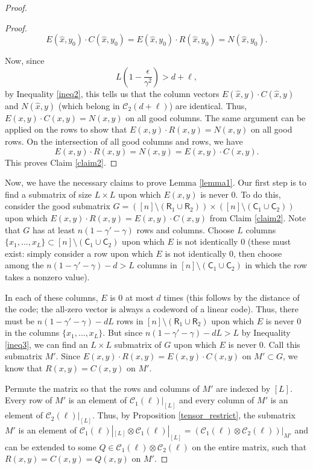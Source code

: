 \documentclass[10pt,a4paper]{amsart}
\newcommand{\Col}{\mathsf{C}}
\newcommand{\C}{\mathcal{C}}
\newcommand{\Row}{\mathsf{R}}
\renewcommand{\d}{d}
\begin{document}
\begin{proof}
\begin{proof}
$$E(\hat x, y_0) \cdot C(\hat x, y_0) = E(\hat x, y_0) \cdot R(\hat x, y_0) = N(\hat x, y_0).$$

Now, since
$$L\left(1-\frac{\epsilon}{\gamma^2}\right) > \d + \ell, $$
by Inequality \eqref{ineq2}, this tells us that  the column vectors $E(\hat x, y) \cdot C(\hat x, y)$ and $N(\hat x, y)$ (which belong in $\C_2(\d + \ell)$) are identical. Thus, $E(x,y) \cdot C(x,y) = N(x,y)$ on all good columns. The same argument can be applied on the rows to show that $E(x,y) \cdot R(x,y) = N(x,y)$ on all good rows. On the intersection of all good columns and rows, we have
$$E(x,y)\cdot R(x,y)=N(x,y)=E(x,y)\cdot C(x,y).$$
This proves Claim \ref{claim2}.
\end{proof}

Now, we have the necessary claims to prove Lemma \ref{lemma1}. Our first step is to find a submatrix of size $L \times L$ upon which $E(x, y)$ is never $0$. To do this, consider the good submatrix $G = ([n] \setminus (\Row_1 \cup \Row_2)) \times ([n] \setminus (\Col_1 \cup \Col_2))$ upon which $E(x,y) \cdot R(x,y) = E(x,y) \cdot C(x,y)$ from Claim \ref{claim2}. Note that $G$ has at least $n(1-\gamma' - \gamma)$ rows and columns. Choose $L$ columns $\{x_1, \dots, x_L\} \subset [n] \setminus (\Col_1 \cup \Col_2)$ upon which $E$ is not identically $0$ (these must exist: simply consider a row upon which $E$ is not identically $0$, then choose among the $n(1-\gamma'-\gamma) - \d > L$ columns in $[n] \setminus (\Col_1 \cup \Col_2)$ in which the row takes a nonzero value). 

In each of these columns, $E$ is $0$ at most $\d$ times (this follows by the distance of the code; the all-zero vector is always a codeword of a linear code). Thus, there must be $n(1 - \gamma' - \gamma) - dL$ rows in $[n] \setminus (\Row_1 \cup \Row_2)$ upon which $E$ is never $0$ in the columns $\{x_1, \dots, x_L\}$. But since $n(1-\gamma' - \gamma) - dL > L$ by Inequality \eqref{ineq3}, we can find an $L \times L$ submatrix of $G$ upon which $E$ is never $0$. Call this submatrix $M'$. Since $E(x,y) \cdot R(x,y) = E(x,y) \cdot C(x,y)$ on $ M'\subset G$, we know that $R(x,y) = C(x,y)$ on $M'$.

Permute the matrix so that the rows and columns of $M'$ are indexed by $[L]$. Every row of $M'$ is an element of $\C_1(\ell)|_{[L]}$ and every column of $M'$ is an element of $\C_2(\ell)|_{[L]}$. Thus, by Proposition \ref{tensor_restrict}, the submatrix $M'$ is an element of $\C_1(\ell)|_{[L]} \otimes \C_1(\ell)|_{[L]} = (\C_1(\ell) \otimes \C_2(\ell))|_{M'}$ and can be extended to some $Q \in \C_1(\ell) \otimes \C_2(\ell)$ on the entire matrix, such that $R(x, y) = C(x, y) = Q(x, y)$ on $M'$. 


\end{proof}
\end{document}
